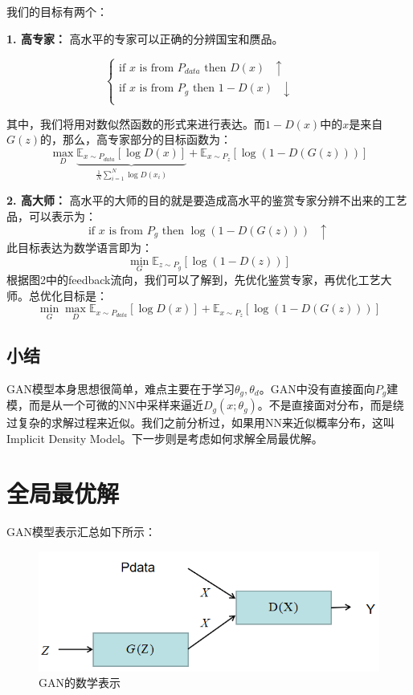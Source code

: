 \documentclass[a4paper]{article}
\begin{document}
我们的目标有两个：

\textbf{1. 高专家：}
高水平的专家可以正确的分辨国宝和赝品。

\begin{equation}
    \left\{
    \begin{array}{ll}
      \text{if $x$ is from $P_{data}$ then $D(x)$ $\uparrow$ } & \\
      \text{if $x$ is from $P_{g}$ then $1-D(x)$ $\downarrow$ } & \\
    \end{array}
    \right.
\end{equation}

其中，我们将用对数似然函数的形式来进行表达。而$1-D(x)$中的$x$是来自$G(z)$的，那么，高专家部分的目标函数为：
\begin{equation}
    \max_D \underbrace{\mathbb{E}_{x\sim P_{data}}[\log D(x)]}_{\frac{1}{N} \sum_{i=1}^N \log D(x_i)} +  \mathbb{E}_{x\sim P_{z}}[\log (1-D(G(z)))]
\end{equation}

\textbf{2. 高大师：}
高水平的大师的目的就是要造成高水平的鉴赏专家分辨不出来的工艺品，可以表示为：
\begin{equation}
    \text{if $x$ is from $P_g$ then $\log(1-D(G(z)))$ $\uparrow$}
\end{equation}
此目标表达为数学语言即为：
\begin{equation}
    \min_G \mathbb{E}_{z\sim P_g}[\log(1-D(z))]
\end{equation}
根据图2中的feedback流向，我们可以了解到，先优化鉴赏专家，再优化工艺大师。总优化目标是：
\begin{equation}
    \min_G \max_D \mathbb{E}_{x\sim P_{data}}[\log D(x)] + \mathbb{E}_{x\sim P_{z}}[\log (1-D(G(z)))]
\end{equation}
\subsection{小结}
GAN模型本身思想很简单，难点主要在于学习$\theta_g,\theta_d$。GAN中没有直接面向$P_g$建模，而是从一个可微的NN中采样来逼近$D_g(x;\theta_g)$。不是直接面对分布，而是绕过复杂的求解过程来近似。我们之前分析过，如果用NN来近似概率分布，这叫Implicit Density Model。下一步则是考虑如何求解全局最优解。

\section{全局最优解}
GAN模型表示汇总如下所示：
\begin{figure}[H]
    \centering
    \includegraphics[width=.65\textwidth]{微信图片_20200606182808.png}
    \caption{GAN的数学表示}
    \label{fig:my_label_1}
\end{figure}
\end{document}

